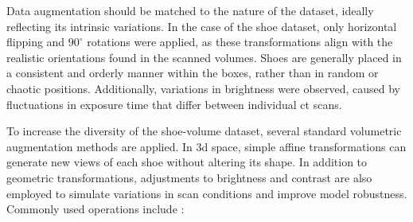 \medskip

Data augmentation should be matched to the nature of the dataset, ideally reflecting its intrinsic variations. In the case of the shoe dataset, only horizontal flipping and $90^\circ$ rotations were applied, as these transformations align with the realistic orientations found in the scanned volumes. Shoes are generally placed in a consistent and orderly manner within the boxes, rather than in random or chaotic positions. Additionally, variations in brightness were observed, caused by fluctuations in exposure time that differ between individual \gls{ct} scans.

\medskip

To increase the diversity of the shoe-volume dataset, several standard volumetric augmentation methods are applied. In \gls{3d} space, simple affine transformations can generate new views of each shoe without altering its shape. In addition to geometric transformations, adjustments to brightness and contrast are also employed to simulate variations in scan conditions and improve model robustness. Commonly used operations include \cite{HaoDataAugmentation, AlomarDataAugmentation, SutassananonDataAugmentation}:
